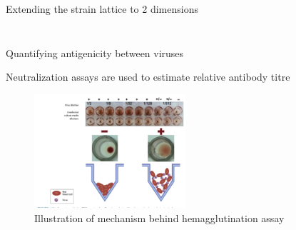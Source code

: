 \documentclass{beamer}
\begin{document}
\begin{frame}{Extending the strain lattice to 2 dimensions}
\begin{columns}
\begin{column}{0.5\textwidth}
\begin{figure}
            \end{figure}
        \end{column}
    \end{columns}
    \centering
    \vfill
    \tiny{\cite{gogDynamicsSelectionManystrain2002}}

\end{frame}



\begin{frame}{Quantifying antigenicity between viruses}
    \begin{figure}
        \centering
        \scalebox{0.9}{
        
        }
    \end{figure}
\end{frame}


\begin{frame}{Neutralization assays are used to estimate relative antibody titre}
    \begin{figure}
        \includegraphics[width=0.5\textwidth]{2022-07-11-22-36-27.png}
        \caption{Illustration of mechanism behind hemagglutination assay}
    \end{figure}
    \centering
    \vfill
    \tiny{\cite{payne2017viruses}}
\end{frame}
\end{document}
